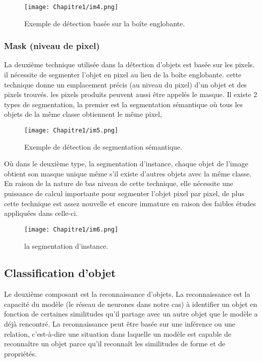      \begin{figure}[H]
          \centering
          \texttt{[image: Chapitre1/im4.png]}
          \caption{Exemple de détection basée sur la boîte englobante.}
          \label{im4}
          \end{figure}

     \subsubsection{Mask (niveau de pixel)}
     La deuxième technique utilisée dans la détection d'objets est basée sur les pixels. il nécessite de segmenter l'objet en pixel au lieu de la boîte englobante. cette technique donne un emplacement précis (au niveau du pixel) d'un objet et des pixels trouvés. les pixels produits peuvent aussi être appelés le masque. Il existe 2 types de segmentation, la premier est la segmentation sémantique où tous les objets de la même classe obtiennent le même pixel,
     \begin{figure}[H]
          \centering
          \texttt{[image: Chapitre1/im5.png]}
          \caption{Exemple de détection de segmentation sémantique.}
          \label{im5}
          \end{figure}
     
          Où dans le deuxième type, la segmentation d'instance, chaque objet de l'image obtient son masque unique même s'il existe d'autres objets avec la même classe. En raison de la nature de bas niveau de cette technique, elle nécessite une puissance de calcul importante pour segmenter l'objet pixel par pixel, de plus cette technique est assez nouvelle et encore immature en raison des faibles études appliquées dans celle-ci.
     \begin{figure}[H]
          \centering
          \texttt{[image: Chapitre1/im6.png]}
          \caption{la segmentation d'instance.}
          \label{im6}
          \end{figure}


     \subsection{Classification d'objet}
     Le deuxième composant est la reconnaissance d'objets. La reconnaissance est la capacité du modèle (le réseau de neurones dans notre cas) à identifier un objet en fonction de certaines similitudes qu'il partage avec un autre objet que le modèle a déjà rencontré. La reconnaissance peut être basée sur une inférence ou une relation, c'est-à-dire une situation dans laquelle un modèle est capable de reconnaître un objet parce qu'il reconnaît les similitudes de forme et de propriétés.

